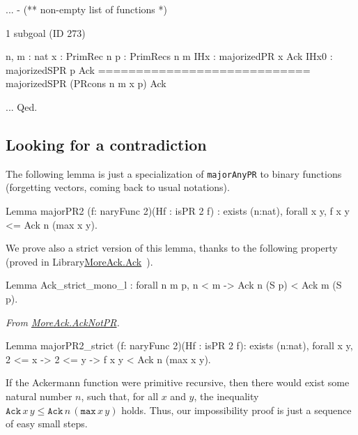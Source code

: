 \begin{Coqsrc}
  ...
- (** non-empty list of functions *)
\end{Coqsrc}

\begin{Coqanswer}
1 subgoal (ID 273)
  
  n, m : nat
  x : PrimRec n
  p : PrimRecs n m
  IHx : majorizedPR x Ack
  IHx0 : majorizedSPR p Ack
  ============================
  majorizedSPR (PRcons n m x p) Ack
\end{Coqanswer}
  
\begin{Coqsrc}
 ...
Qed.
\end{Coqsrc}

\subsection{Looking for a contradiction}

The following lemma is just a specialization of \texttt{majorAnyPR} to
binary functions (forgetting vectors, coming back to usual notations).

\begin{Coqsrc}
Lemma majorPR2 (f: naryFunc 2)(Hf : isPR 2 f)
  : exists (n:nat), forall x y,  f x y <= Ack n (max x  y).
\end{Coqsrc}

We prove also a strict version of this lemma, thanks to the following property (proved in Library\href{../theories/html/hydras.MoreAck.Ack.html}{MoreAck.Ack}~).

\begin{Coqsrc}
Lemma Ack_strict_mono_l : forall n m p, n < m ->
                                        Ack n (S p) < Ack m (S p).
\end{Coqsrc}

\vspace{4pt}
\noindent
\emph{From \href{../theories/html/hydras.MoreAck.AcknotPR.html}{MoreAck.AckNotPR}.}

\begin{Coqsrc}
Lemma majorPR2_strict (f: naryFunc 2)(Hf : isPR 2 f):
    exists (n:nat),
    forall x y, 2 <= x -> 2 <= y -> f x y < Ack n (max x  y).
\end{Coqsrc}



If the Ackermann function were primitive recursive, then there would exist some natural number $n$, such that, for all $x$ and $y$, the inequality 
$\texttt{Ack}\,x\,y\leq \texttt{Ack}\,n\,(\texttt{max}\,x\,y)$ holds.
Thus, our impossibility proof is just a sequence of easy small steps.

